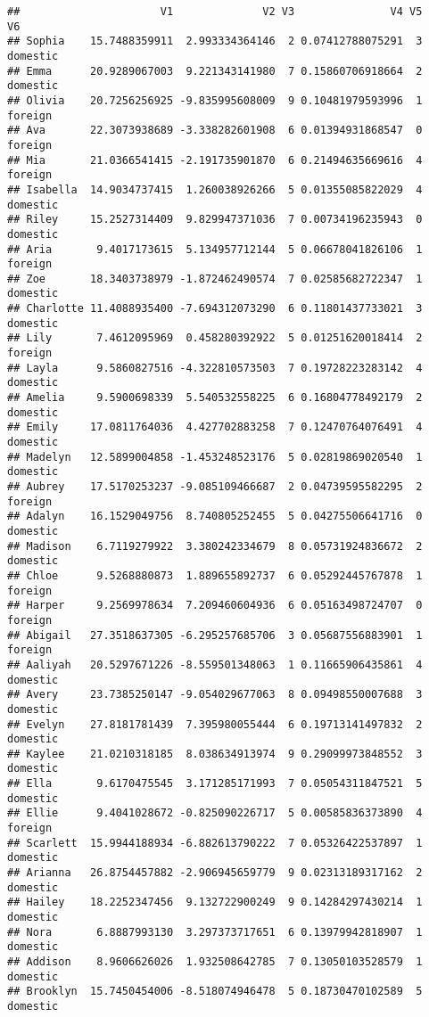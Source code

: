 \documentclass[
]{article}
\begin{document}
\begin{verbatim}
##                      V1              V2 V3               V4 V5       V6
## Sophia    15.7488359911  2.993334364146  2 0.07412788075291  3 domestic
## Emma      20.9289067003  9.221343141980  7 0.15860706918664  2 domestic
## Olivia    20.7256256925 -9.835995608009  9 0.10481979593996  1  foreign
## Ava       22.3073938689 -3.338282601908  6 0.01394931868547  0  foreign
## Mia       21.0366541415 -2.191735901870  6 0.21494635669616  4  foreign
## Isabella  14.9034737415  1.260038926266  5 0.01355085822029  4 domestic
## Riley     15.2527314409  9.829947371036  7 0.00734196235943  0 domestic
## Aria       9.4017173615  5.134957712144  5 0.06678041826106  1  foreign
## Zoe       18.3403738979 -1.872462490574  7 0.02585682722347  1 domestic
## Charlotte 11.4088935400 -7.694312073290  6 0.11801437733021  3 domestic
## Lily       7.4612095969  0.458280392922  5 0.01251620018414  2  foreign
## Layla      9.5860827516 -4.322810573503  7 0.19728223283142  4 domestic
## Amelia     9.5900698339  5.540532558225  6 0.16804778492179  2 domestic
## Emily     17.0811764036  4.427702883258  7 0.12470764076491  4 domestic
## Madelyn   12.5899004858 -1.453248523176  5 0.02819869020540  1 domestic
## Aubrey    17.5170253237 -9.085109466687  2 0.04739595582295  2  foreign
## Adalyn    16.1529049756  8.740805252455  5 0.04275506641716  0 domestic
## Madison    6.7119279922  3.380242334679  8 0.05731924836672  2 domestic
## Chloe      9.5268880873  1.889655892737  6 0.05292445767878  1  foreign
## Harper     9.2569978634  7.209460604936  6 0.05163498724707  0  foreign
## Abigail   27.3518637305 -6.295257685706  3 0.05687556883901  1  foreign
## Aaliyah   20.5297671226 -8.559501348063  1 0.11665906435861  4 domestic
## Avery     23.7385250147 -9.054029677063  8 0.09498550007688  3 domestic
## Evelyn    27.8181781439  7.395980055444  6 0.19713141497832  2 domestic
## Kaylee    21.0210318185  8.038634913974  9 0.29099973848552  3 domestic
## Ella       9.6170475545  3.171285171993  7 0.05054311847521  5 domestic
## Ellie      9.4041028672 -0.825090226717  5 0.00585836373890  4  foreign
## Scarlett  15.9944188934 -6.882613790222  7 0.05326422537897  1 domestic
## Arianna   26.8754457882 -2.906945659779  9 0.02313189317162  2 domestic
## Hailey    18.2252347456  9.132722900249  9 0.14284297430214  1 domestic
## Nora       6.8887993130  3.297373717651  6 0.13979942818907  1 domestic
## Addison    8.9606626026  1.932508642785  7 0.13050103528579  1 domestic
## Brooklyn  15.7450454006 -8.518074946478  5 0.18730470102589  5 domestic

\end{verbatim}
\end{document}
